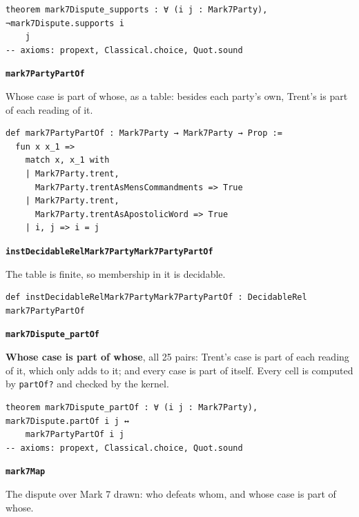 \documentclass[11pt]{article}
\begin{document}
{\small\begin{verbatim}
theorem mark7Dispute_supports : ∀ (i j : Mark7Party), ¬mark7Dispute.supports i
    j
-- axioms: propext, Classical.choice, Quot.sound
\end{verbatim}}
\par\medskip\noindent\textbf{\texttt{mark7\allowbreak{}Party\allowbreak{}Part\allowbreak{}Of}}\par\nobreak\noindent
Whose case is part of whose, as a table: besides each party's own, Trent's is part of each reading of it.

{\small\begin{verbatim}
def mark7PartyPartOf : Mark7Party → Mark7Party → Prop :=
  fun x x_1 =>
    match x, x_1 with
    | Mark7Party.trent,
      Mark7Party.trentAsMensCommandments => True
    | Mark7Party.trent,
      Mark7Party.trentAsApostolicWord => True
    | i, j => i = j
\end{verbatim}}
\par\medskip\noindent\textbf{\texttt{inst\allowbreak{}Decidable\allowbreak{}Rel\allowbreak{}Mark7\allowbreak{}Party\allowbreak{}Mark7\allowbreak{}Party\allowbreak{}Part\allowbreak{}Of}}\par\nobreak\noindent
The table is finite, so membership in it is decidable.

{\small\begin{verbatim}
def instDecidableRelMark7PartyMark7PartyPartOf : DecidableRel mark7PartyPartOf
\end{verbatim}}
\par\medskip\noindent\textbf{\texttt{mark7\allowbreak{}Dispute\_\allowbreak{}part\allowbreak{}Of}}\par\nobreak\noindent
\textbf{Whose case is part of whose}, all 25 pairs: Trent's case is part of each reading of it, which only adds to it; and every case is part of itself. Every cell is computed by \texttt{part\allowbreak{}Of?} and checked by the kernel.

{\small\begin{verbatim}
theorem mark7Dispute_partOf : ∀ (i j : Mark7Party), mark7Dispute.partOf i j ↔
    mark7PartyPartOf i j
-- axioms: propext, Classical.choice, Quot.sound
\end{verbatim}}
\par\medskip\noindent\textbf{\texttt{mark7\allowbreak{}Map}}\par\nobreak\noindent
The dispute over Mark 7 drawn: who defeats whom, and whose case is part of whose.
\end{document}
